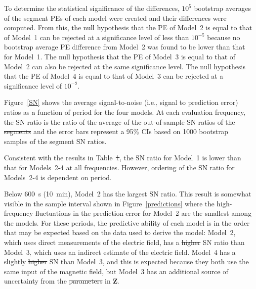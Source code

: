 \documentclass[draft,linenumbers]{agujournal2018}
\providecommand{\DIFaddtex}[1]{{\protect\color{blue}\uwave{#1}}} %
\providecommand{\DIFdeltex}[1]{{\protect\color{red}\sout{#1}}}                      %
\providecommand{\DIFaddbegin}{} %
\providecommand{\DIFaddend}{} %
\providecommand{\DIFdelbegin}{} %
\providecommand{\DIFdelend}{} %
\providecommand{\DIFadd}[1]{\texorpdfstring{\DIFaddtex{#1}}{#1}} %
\providecommand{\DIFdel}[1]{\texorpdfstring{\DIFdeltex{#1}}{}} %
\begin{document}
To determine the statistical significance of the \DIFaddbegin \DIFadd{PE }\DIFaddend differences, $10^5$ bootstrap averages of the segment PEs of each model were created and their differences were computed. From this, the null hypothesis that the PE of Model~2 is equal to that of Model~1 can be rejected at a significance level of less than $10^{-5}$ because no bootstrap average PE difference from Model~2 was found to be lower than that for Model~1. The null hypothesis that the PE of Model~3 is equal to that of Model~2 can also be rejected at the same significance level. The null hypothesis that the PE of Model~4 is equal to that of Model~3 can be rejected at a significance level of $10^{-2}$.

\DIFdelbegin %

\DIFdelend Figure~\ref{SN} shows the average signal-to-noise (i.e., signal to prediction error) ratios as a function of period for the four models. At each evaluation frequency, the SN ratio is the ratio of the average of the out-of-sample SN ratios \DIFdelbegin \DIFdel{of the segments }\DIFdelend and the error bars represent a 95\% CIs based on 1000 bootstrap samples of the segment SN ratios. \DIFdelbegin %

\DIFdelend Consistent with the results in Table~\DIFdelbegin \DIFdel{1}\DIFdelend \DIFaddbegin \DIFadd{\ref{results}}\DIFaddend , the SN ratio for Model~1 is lower than that for Models~2-4 at all frequencies. However, ordering of the SN ratio for Models~2-4 is dependent on period. 

Below $600$~s (10~min), Model~2 has the largest SN ratio. This result is somewhat visible in the sample interval shown in Figure~\ref{predictions} where the high-frequency fluctuations in the prediction error for Model~2 are the smallest among the models. For these periods, the predictive ability of each model is in the order that may be expected based on the data used to derive the model: Model~2, which uses direct measurements of the electric field, has a \DIFdelbegin \DIFdel{higher }\DIFdelend \DIFaddbegin \DIFadd{larger }\DIFaddend SN ratio than Model~3, which uses an indirect estimate of the electric field. Model~4 has a slightly \DIFdelbegin \DIFdel{higher }\DIFdelend \DIFaddbegin \DIFadd{larger }\DIFaddend SN than Model~3, and this is expected because they both use the same input of the magnetic field, but Model~3 has an additional source of uncertainty from the \DIFdelbegin \DIFdel{parameters }\DIFdelend \DIFaddbegin \DIFadd{data-estimated coefficients }\DIFaddend in $\mathbf{Z}$.
\end{document}
